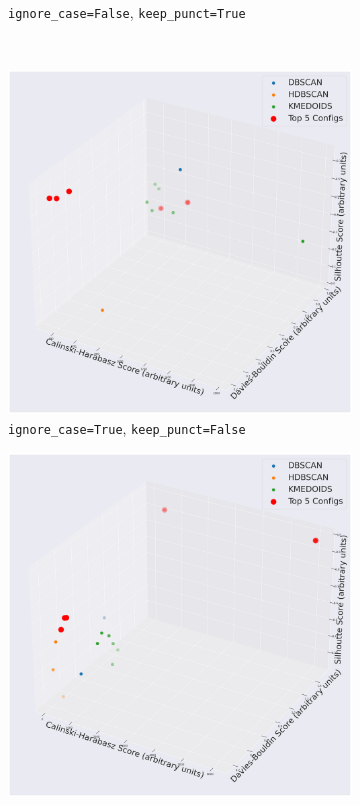 \documentclass[10pt,oneside]{report}
\begin{document}
\begin{figure}[H]
\begin{subfigure}[b]{0.48\textwidth}
        \caption{\texttt{ignore\_case=False}, \texttt{keep\_punct=True}}
        \label{fig:nomic_ft_f4a_config} %
    \end{subfigure}
    \\
    \vspace{1em}
    \begin{subfigure}[b]{0.48\textwidth}
        \centering
        \includegraphics[width=\textwidth]{./images/nomic_false-true.png}
        \caption{\texttt{ignore\_case=True}, \texttt{keep\_punct=False}}
        \label{fig:nomic_tf_f4a_config} %
    \end{subfigure}
    \hfill
    \begin{subfigure}[b]{0.48\textwidth}
        \centering
        \includegraphics[width=\textwidth]{./images/nomic_true-true.png}

\end{subfigure}
\end{figure}
\end{document}
